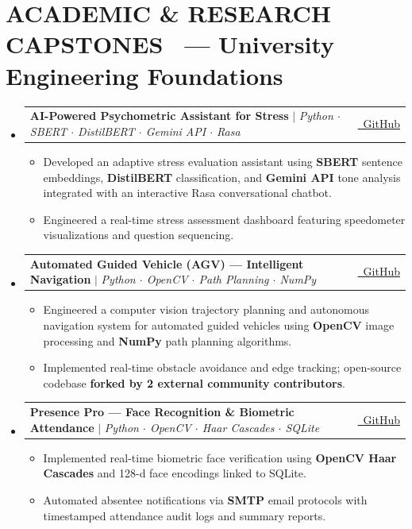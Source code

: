 \documentclass[letterpaper,10pt]{article}
\makeatletter
\newcommand{\resumeItem}[1]{\item\small{#1}}
\newcommand{\resumeProjectHeading}[2]{
  \vspace{1.5pt}\item
    \begin{tabular*}{0.98\textwidth}{l@{\extracolsep{\fill}}r}
      \small#1 & \small#2 \\
    \end{tabular*}\vspace{0.5pt}
}
\newcommand{\resumeSubHeadingListStart}{\begin{itemize}[leftmargin=0.12in, label={}]}
\newcommand{\resumeSubHeadingListEnd}{\end{itemize}\vspace{1.5pt}}
\newcommand{\resumeItemListStart}{\begin{itemize}[leftmargin=0.15in, label=\textbullet]}
\newcommand{\resumeItemListEnd}{\end{itemize}\vspace{2pt}}
\makeatother
\begin{document}
\section[ACADEMIC \& RESEARCH CAPSTONES]{ACADEMIC \& RESEARCH CAPSTONES \ {\small\normalfont\color{midgray}--- University Engineering Foundations}}
\resumeSubHeadingListStart
  \resumeProjectHeading
    {\textbf{AI-Powered Psychometric Assistant for Stress}
     $|$ \emph{\small Python $\cdot$ SBERT $\cdot$ DistilBERT $\cdot$ Gemini API $\cdot$ Rasa}}
    {\href{https://github.com/GOKULKRISHNAN2044/AI-Powered-Psychometric-Assistant-for-Stress}{\faIcon{github}\ GitHub}}
  \resumeItemListStart
    \resumeItem{Developed an adaptive stress evaluation assistant using \textbf{SBERT} sentence embeddings, \textbf{DistilBERT} classification, and \textbf{Gemini API} tone analysis integrated with an interactive Rasa conversational chatbot.}
    \resumeItem{Engineered a real-time stress assessment dashboard featuring speedometer visualizations and question sequencing.}
  \resumeItemListEnd

  \resumeProjectHeading
    {\textbf{Automated Guided Vehicle (AGV) --- Intelligent Navigation}
     $|$ \emph{\small Python $\cdot$ OpenCV $\cdot$ Path Planning $\cdot$ NumPy}}
    {\href{https://github.com/GOKULKRISHNAN2044/Automated-Guided-Vehicle-AGV-for-Intelligent-Navigation}{\faIcon{github}\ GitHub}}
  \resumeItemListStart
    \resumeItem{Engineered a computer vision trajectory planning and autonomous navigation system for automated guided vehicles using \textbf{OpenCV} image processing and \textbf{NumPy} path planning algorithms.}
    \resumeItem{Implemented real-time obstacle avoidance and edge tracking; open-source codebase \textbf{forked by 2 external community contributors}.}
  \resumeItemListEnd

  \resumeProjectHeading
    {\textbf{Presence Pro --- Face Recognition \& Biometric Attendance}
     $|$ \emph{\small Python $\cdot$ OpenCV $\cdot$ Haar Cascades $\cdot$ SQLite}}
    {\href{https://github.com/GOKULKRISHNAN2044/Presence-Pro-Face-Recognition-and-Attendance-Reminder}{\faIcon{github}\ GitHub}}
  \resumeItemListStart
    \resumeItem{Implemented real-time biometric face verification using \textbf{OpenCV Haar Cascades} and 128-d face encodings linked to SQLite.}
    \resumeItem{Automated absentee notifications via \textbf{SMTP} email protocols with timestamped attendance audit logs and summary reports.}
  \resumeItemListEnd
\resumeSubHeadingListEnd
\end{document}
